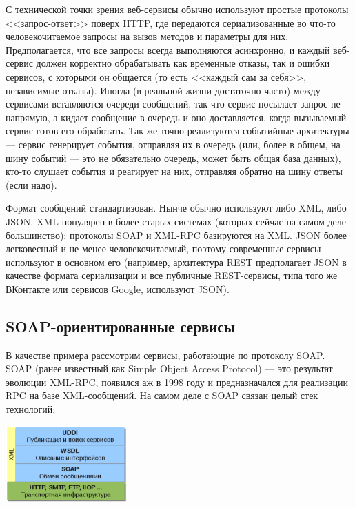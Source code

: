 \documentclass{../../text-style}
\begin{document}
С технической точки зрения веб-сервисы обычно используют простые протоколы <<запрос-ответ>> поверх HTTP, где передаются сериализованные во что-то человекочитаемое запросы на вызов методов и параметры для них. Предполагается, что все запросы всегда выполняются асинхронно, и каждый веб-сервис должен корректно обрабатывать как временные отказы, так и ошибки сервисов, с которыми он общается (то есть <<каждый сам за себя>>, независимые отказы). Иногда (в реальной жизни достаточно часто) между сервисами вставляются очереди сообщений, так что сервис посылает запрос не напрямую, а кидает сообщение в очередь и оно доставляется, когда вызываемый сервис готов его обработать. Так же точно реализуются событийные архитектуры --- сервис генерирует события, отправляя их в очередь (или, более в общем, на шину событий --- это не обязательно очередь, может быть общая база данных), кто-то слушает события и реагирует на них, отправляя обратно на шину ответы (если надо).

Формат сообщений стандартизован. Нынче обычно используют либо XML, либо JSON. XML популярен в более старых системах (которых сейчас на самом деле большинство): протоколы SOAP и XML-RPC базируются на XML. JSON более легковесный и не менее человекочитаемый, поэтому современные сервисы используют в основном его (например, архитектура REST предполагает JSON в качестве формата сериализации и все публичные REST-сервисы, типа того же ВКонтакте или сервисов Google, используют JSON).

\subsection{SOAP-ориентированные сервисы}

В качестве примера рассмотрим сервисы, работающие по протоколу SOAP. SOAP (ранее известный как Simple Object Access Protocol) --- это результат эволюции XML-RPC, появился аж в 1998 году и предназначался для реализации RPC на базе XML-сообщений. На самом деле с SOAP связан целый стек технологий:

\begin{center}
    \includegraphics[width=0.35\textwidth]{soap.png}
\end{center}
\end{document}
